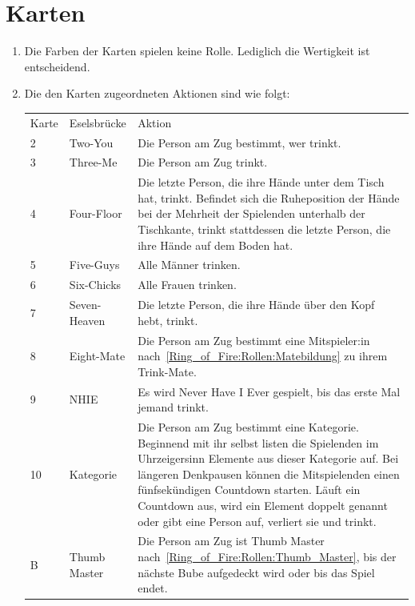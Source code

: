 \section{Karten}\label{Ring_of_Fire:Karten}
\begin{enumerate}[label={(\arabic*)}]
	\item
	Die Farben der Karten spielen keine Rolle. Lediglich die Wertigkeit ist entscheidend.
	
	\item\label{Ring_of_Fire:Karten:Tabelle}
	Die den Karten zugeordneten Aktionen sind wie folgt:

	\begin{longtable}[r]{p{}  p{}  p{}} %
		\toprule
		Karte & Eselsbrücke & Aktion \\
		2  & Two-You        & Die Person am Zug bestimmt, wer trinkt.\\
		3  & Three-Me       & Die Person am Zug trinkt.\\
		4  & Four-Floor     & Die letzte Person, die ihre Hände unter dem Tisch hat, trinkt.
		Befindet sich die Ruheposition der Hände bei der Mehrheit der Spielenden unterhalb der Tischkante, trinkt stattdessen die letzte Person, die ihre Hände auf dem Boden hat.\\
		5  & Five-Guys      & Alle Männer trinken.\\
		6  & Six-Chicks     & Alle Frauen trinken.\\
		7  & Seven-Heaven   & Die letzte Person, die ihre Hände über den Kopf hebt, trinkt.\\
		8  & Eight-Mate     & Die Person am Zug bestimmt eine Mitspieler:in nach~\ref{Ring_of_Fire:Rollen:Matebildung} zu ihrem Trink-Mate.\\
		9  & NHIE           & Es wird \glqq{}Never Have I Ever\grqq{} gespielt, bis das erste Mal jemand trinkt.\\
		10 & Kategorie      & Die Person am Zug bestimmt eine Kategorie.
		Beginnend mit ihr selbst listen die Spielenden im Uhrzeigersinn Elemente aus dieser Kategorie auf.
		Bei längeren Denkpausen können die Mitspielenden einen fünfsekündigen Countdown starten.
		Läuft ein Countdown aus, wird ein Element doppelt genannt oder gibt eine Person auf, verliert sie und trinkt.\\
		B  & Thumb Master   & Die Person am Zug ist Thumb Master nach~\ref{Ring_of_Fire:Rollen:Thumb_Master}, bis der nächste Bube aufgedeckt wird oder bis das Spiel endet.\\

\end{longtable}
\end{enumerate}
